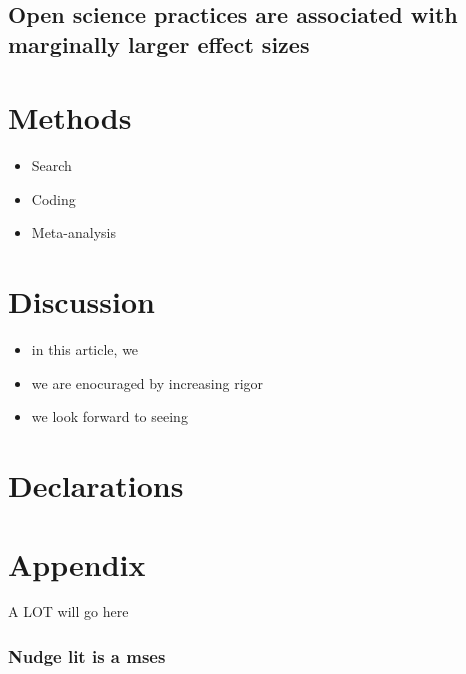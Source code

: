 \documentclass[sn-nature,pdflatex]{sn-jnl}
\providecommand{\tightlist}{%
  \setlength{\itemsep}{0pt}\setlength{\parskip}{0pt}}
\begin{document}
\subsection{Open science practices are associated with marginally larger
effect
sizes}\label{open-science-practices-are-associated-with-marginally-larger-effect-sizes}

\section{Methods}\label{sec3}

\begin{itemize}
\tightlist
\item
  Search
\item
  Coding
\item
  Meta-analysis
\end{itemize}

\section{Discussion}\label{sec4}

\begin{itemize}
\tightlist
\item
  in this article, we
\item
  we are enocuraged by increasing rigor
\item
  we look forward to seeing
\end{itemize}

\backmatter



\section*{Declarations}\label{declarations}

\section{Appendix}\label{secA1}

A LOT will go here

\subsubsection{Nudge lit is a mses}\label{nudge-lit-is-a-mses}
\end{document}
